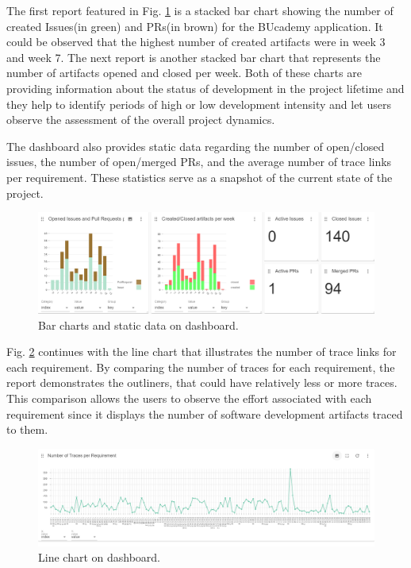The first report featured in Fig. \ref{fig:barcharts} is a stacked bar chart showing the number of created Issues(in green) and PRs(in brown) for the BUcademy application. It could be observed that the highest number of created artifacts were in week 3 and week 7. The next report is another stacked bar chart that represents the number of artifacts opened and closed per week. Both of these charts are providing information about the status of development in the project lifetime and they help to identify periods of high or low development intensity and let users observe the assessment of the overall project dynamics.

The dashboard also provides static data regarding the number of open/closed issues, the number of open/merged PRs, and the average number of trace links per requirement. These statistics serve as a snapshot of the current state of the project.

\begin{figure}[htb]
    \centering
    \includegraphics[width=0.9\linewidth]{figs/dashboard-barcharts.png}
    \caption{Bar charts and static data on dashboard.}
    \label{fig:barcharts}
\end{figure}

Fig. \ref{fig:linechart} continues with the line chart that illustrates the number of trace links for each requirement. By comparing the number of traces for each requirement, the report demonstrates the outliners, that could have relatively less or more traces. This comparison allows the users to observe the effort associated with each requirement since it displays the number of software development artifacts traced to them.

\begin{figure}[htb]
    \centering
    \includegraphics[width=0.9\linewidth]{figs/linechart.png}
    \caption{Line chart on dashboard.}
    \label{fig:linechart}
\end{figure}


